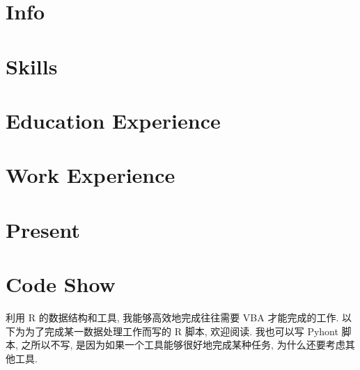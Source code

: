 \documentclass[a4paper]{article}
\begin{document}
	\section*{Info}
		
	\section*{Skills}
		
	\section*{Education Experience}
		
	\section*{Work Experience}
		
	\section*{Present}
		
	\section*{Code Show}
		利用 R 的数据结构和工具, 我能够高效地完成往往需要 VBA 才能完成的工作. 以下为为了完成某一数据处理工作而写的 R 脚本, 欢迎阅读. 我也可以写 Pyhont 脚本, 之所以不写, 是因为如果一个工具能够很好地完成某种任务, 为什么还要考虑其他工具.
			
			
		
			
\end{document}
